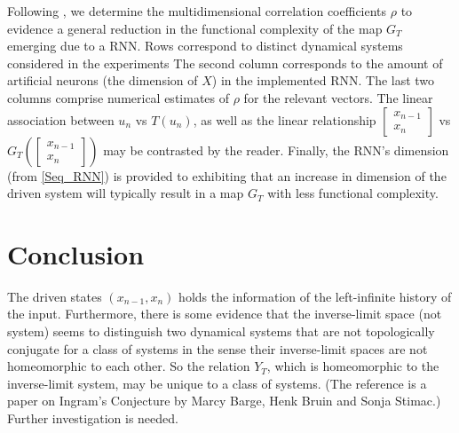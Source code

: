 \documentclass[a4paper,12pt,twoside]{report}
\begin{document}
\begin{center}
\begin{table}
      \caption{Following \cite{manjunath2021universal}, we determine the multidimensional correlation coefficients $\rho$ to evidence a general reduction in the functional complexity of the map $G_T$ emerging due to a RNN. Rows correspond to distinct dynamical systems considered in the experiments
      The second column corresponds to the amount of artificial neurons (the dimension of $X$) in the implemented RNN.
      The last two columns comprise numerical estimates of $\rho$ for the relevant vectors. The linear association between $u_n$ vs $T(u_{n})$, as well as the linear relationship $\begin{bmatrix}
              x_{n-1}\\
              x_n
          \end{bmatrix}$ vs $G_T \left( \begin{bmatrix}
              x_{n-1}\\
              x_n
          \end{bmatrix}\right)$ may be contrasted by the reader. 
          Finally, the RNN's dimension (from \eqref{Seq_RNN}) is provided to exhibiting that an increase in dimension of the driven system will 
          typically result in a map $G_T$ with less functional complexity.} 
          \label{Table_FC}
      \end{table}\label{tbl_attractorsPearson}
\end{center}
  



\chapter{Conclusion}\label{ch6}

The driven states $(x_{n-1},x_n)$ holds the information of the left-infinite history of the input. Furthermore, there is some evidence that the inverse-limit space (not system) seems to distinguish two dynamical systems that are not topologically conjugate for a class of systems in the sense their inverse-limit spaces are not homeomorphic to each other.  So the relation $Y_T$, which is homeomorphic to the inverse-limit system, may be unique to a class of systems. (The reference is a paper on Ingram’s Conjecture by Marcy Barge, Henk Bruin and Sonja Stimac.) Further investigation is needed. 

\end{document}
